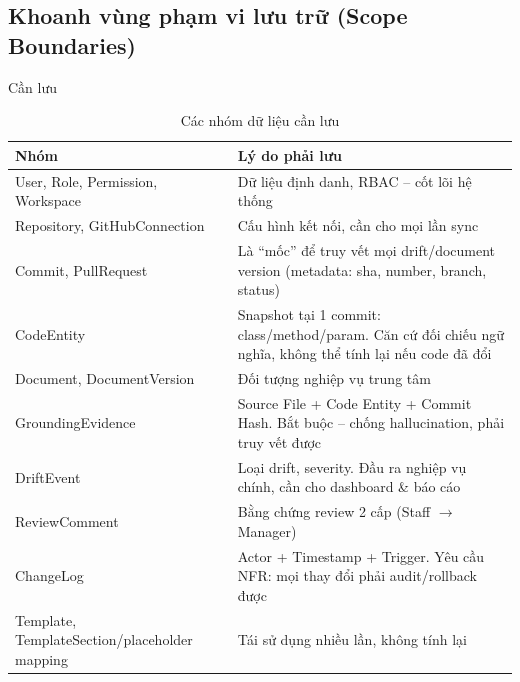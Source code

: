 \subsection{Khoanh vùng phạm vi lưu trữ (Scope Boundaries)}\label{s:pham_vi_luu_tru}

Cần lưu
\begin{table}[H]
\centering
\renewcommand{\arraystretch}{1.4}
\begin{tabular}{|p{}|p{}|}
\hline
\textbf{Nhóm} & \textbf{Lý do phải lưu} \\
\hline

User, Role, Permission, Workspace
&
Dữ liệu định danh, RBAC -- cốt lõi hệ thống \\
\hline

Repository, GitHubConnection
&
Cấu hình kết nối, cần cho mọi lần sync \\
\hline

Commit, PullRequest
&
Là ``mốc'' để truy vết mọi drift/document version
(metadata: sha, number, branch, status) \\
\hline

CodeEntity
&
Snapshot tại 1 commit: class/method/param.
Căn cứ đối chiếu ngữ nghĩa, không thể tính lại nếu code đã đổi \\
\hline

Document, DocumentVersion
&
Đối tượng nghiệp vụ trung tâm \\
\hline

GroundingEvidence
&
Source File + Code Entity + Commit Hash.
Bắt buộc -- chống hallucination, phải truy vết được \\
\hline

DriftEvent
&
Loại drift, severity.
Đầu ra nghiệp vụ chính, cần cho dashboard \& báo cáo \\
\hline

ReviewComment
&
Bằng chứng review 2 cấp (Staff $\rightarrow$ Manager) \\
\hline

ChangeLog
&
Actor + Timestamp + Trigger.
Yêu cầu NFR: mọi thay đổi phải audit/rollback được \\
\hline

Template, TemplateSection/placeholder mapping
&
Tái sử dụng nhiều lần, không tính lại \\
\hline



\end{tabular}
\caption{Các nhóm dữ liệu cần lưu}
\label{tab:data-storage}
\end{table}
